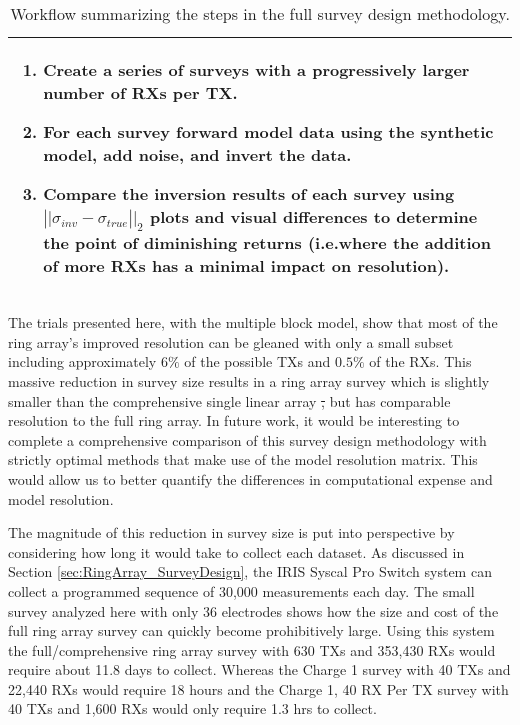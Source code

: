 \documentclass[preprint,authoryear,12pt]{elsarticle}
\newcommand{\midtilde}{\raisebox{-0.25\baselineskip}{\textasciitilde}}
\providecommand{\DIFaddtex}[1]{{\protect\color{blue}\uwave{#1}}} %
\providecommand{\DIFdeltex}[1]{{\protect\color{red}\sout{#1}}}                      %
\providecommand{\DIFaddbegin}{} %
\providecommand{\DIFaddend}{} %
\providecommand{\DIFdelbegin}{} %
\providecommand{\DIFdelend}{} %
\providecommand{\DIFaddFL}[1]{\DIFadd{#1}} %
\providecommand{\DIFaddbeginFL}{} %
\providecommand{\DIFaddendFL}{} %
\providecommand{\DIFadd}[1]{\texorpdfstring{\DIFaddtex{#1}}{#1}} %
\providecommand{\DIFdel}[1]{\texorpdfstring{\DIFdeltex{#1}}{}} %
\begin{document}
\begin{table}
\begin{tabular} {|p{0.001cm} p{\linewidth}|}
\begin{enumerate}[leftmargin=*]
\begin{enumerate}
                  \item Create a series of surveys with a progressively larger number of RXs per TX.
                  \item For each survey forward model data using the synthetic model, add noise, and invert the data.
                  \item Compare the inversion results of each survey using $\left|| \sigma_{inv} - \sigma_{true} \right||_2$ plots and visual differences to determine the point of diminishing returns (i.e.\DIFaddbeginFL \DIFaddFL{,  }\DIFaddendFL where the addition of more RXs has a minimal impact on resolution).
               \end{enumerate}

         \end{enumerate} \\
      \hline
   \end{tabular}
   \caption{Workflow summarizing the steps in the full survey design methodology.}
   \label{table:Full_SurveyDesign_Methodology}
\end{table}

The trials presented here, with the multiple block model, show that most of the ring array's improved resolution can be gleaned with only a small subset including approximately $6\%$ of the possible TXs and $0.5\%$ of the RXs. This massive reduction in survey size results in a ring array survey which is slightly smaller than the comprehensive single linear array \DIFdelbegin \DIFdel{, }\DIFdelend but has comparable resolution to the full ring array. In future work, it would be interesting to complete a comprehensive comparison of this survey design methodology with strictly optimal methods that make use of the model resolution matrix. This \DIFaddbegin \DIFadd{comparison }\DIFaddend would allow us to better quantify the differences in computational expense and model resolution.

The magnitude of this reduction in survey size is put into perspective by considering how long it would take to collect each dataset. As discussed in Section \ref{sec:RingArray_SurveyDesign}, the IRIS Syscal Pro Switch system can collect a programmed sequence of \midtilde30,000 measurements each day. The small survey analyzed here with only 36 electrodes shows how the size and cost of the full ring array survey can quickly become prohibitively large. Using this system the full/comprehensive ring array survey with 630 TXs and 353,430 RXs would require about 11.8 days to collect. Whereas the Charge 1 survey with 40 TXs and 22,440 RXs would require 18 hours and the Charge 1, 40 RX Per TX survey with 40 TXs and 1,600 RXs would only require 1.3 hrs to collect.
\end{document}
